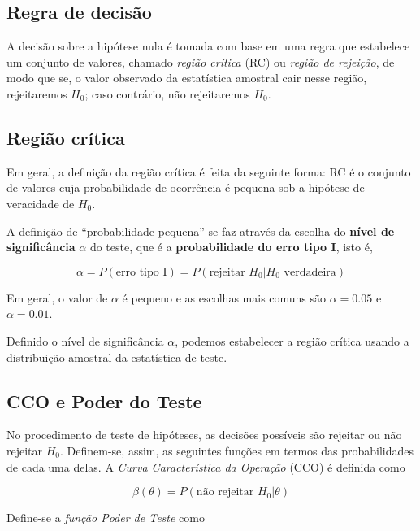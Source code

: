 \documentclass[
]{book}
\begin{document}
\hypertarget{regra-de-decisuxe3o}{%
\subsection{Regra de decisão}\label{regra-de-decisuxe3o}}

A decisão sobre a hipótese nula é tomada com base em uma regra que estabelece um conjunto de valores, chamado \emph{região crítica} (RC) ou \emph{região de rejeição}, de modo que se, o valor observado da estatística amostral cair nesse região, rejeitaremos \(H_0\); caso contrário, não rejeitaremos \(H_0\).

\hypertarget{regiuxe3o-cruxedtica}{%
\subsection{Região crítica}\label{regiuxe3o-cruxedtica}}

Em geral, a definição da região crítica é feita da seguinte forma: RC é o conjunto de valores cuja probabilidade de ocorrência é pequena sob a hipótese de veracidade de \(H_0\).

A definição de ``probabilidade pequena'' se faz através da escolha do \textbf{nível de significância} \(\alpha\) do teste, que é a \textbf{probabilidade do erro tipo I}, isto é,

\[\alpha=P(\text{erro tipo I})=P(\text{rejeitar } H_0 | H_0 \text{ verdadeira})\]

Em geral, o valor de \(\alpha\) é pequeno e as escolhas mais comuns são \(\alpha=0.05\) e \(\alpha=0.01\).

Definido o nível de significância \(\alpha\), podemos estabelecer a região crítica usando a distribuição amostral da estatística de teste.

\hypertarget{cco-e-poder-do-teste}{%
\subsection{CCO e Poder do Teste}\label{cco-e-poder-do-teste}}

No procedimento de teste de hipóteses, as decisões possíveis são rejeitar ou não rejeitar \(H_0\). Definem-se, assim, as seguintes funções em termos das probabilidades de cada uma delas. A \emph{Curva Característica da Operação} (CCO) é definida como

\[\beta(\theta)=P(\text{não rejeitar } H_0|\theta)\]

Define-se a \emph{função Poder de Teste} como
\end{document}
